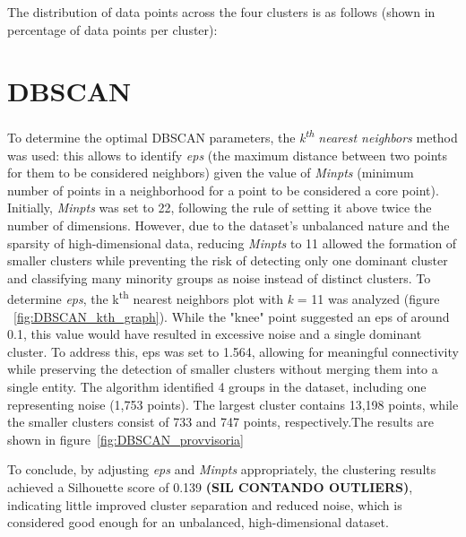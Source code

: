 The distribution of data points across the four clusters is as follows (shown in percentage of data points per cluster):



\section{DBSCAN}\label{sec:density_based}
To determine the optimal DBSCAN parameters, the \textit{k\textsuperscript{th} nearest neighbors} method was used: this allows to identify \textit{eps} (the maximum distance between two points for them to be considered neighbors) given the value of \textit{Minpts} (minimum number of points in a neighborhood for a point to be considered a core point).
Initially, \textit{Minpts} was set to 22, following the rule of setting it above twice the number of dimensions. 
However, due to the dataset's unbalanced nature and the sparsity of high-dimensional data, reducing \textit{Minpts} to 11 allowed the formation of smaller clusters while preventing the risk of detecting only one dominant cluster and classifying many minority groups as noise instead of distinct clusters.
To determine \textit{eps}, the k\textsuperscript{th} nearest neighbors plot with \textit{k} = 11 was analyzed (figure ~\ref{fig:DBSCAN_kth_graph}). While the "knee" point suggested an eps of around 0.1, this value would have resulted in excessive noise and a single dominant cluster. 
To address this, eps was set to 1.564, allowing for meaningful connectivity while preserving the detection of smaller clusters without merging them into a single entity. 
The algorithm identified 4 groups in the dataset, including one representing noise (1,753 points). 
The largest cluster contains 13,198 points, while the smaller clusters consist of 733 and 747 points, 
respectively.The  results are shown in figure~\ref{fig:DBSCAN_provvisoria}

To conclude, by adjusting \textit{eps} and \textit{Minpts} appropriately, the clustering results achieved a Silhouette score of 0.139 \textbf{(SIL CONTANDO OUTLIERS)}, indicating little improved cluster separation and reduced noise, which is considered good enough for an unbalanced, high-dimensional dataset.

